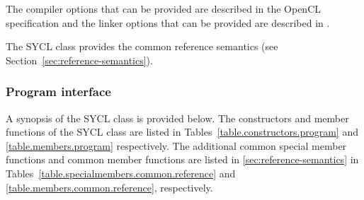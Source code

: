 The compiler options that can be provided are described in the OpenCL specification \cite[p.~145, \S~5.6.4]{opencl12} and the linker options that can be provided are described in \cite[p.~148,\S~5.6.5]{opencl12}.

The SYCL  class provides the common reference semantics
(see Section~\ref{sec:reference-semantics}).

\subsubsection{Program interface}

A synopsis of the SYCL  class is provided below. The constructors and member functions of the SYCL  class are listed in Tables~\ref{table.constructors.program} and \ref{table.members.program} respectively. The additional common special member functions and common member functions are listed in
\ref{sec:reference-semantics} in Tables~\ref{table.specialmembers.common.reference} and \ref{table.members.common.reference}, respectively.



